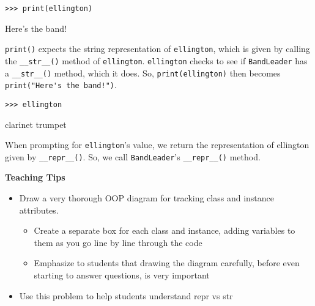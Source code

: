 \begin{blocksection}
\vspace{2\baselineskip}

\begin{lstlisting}
>>> print(ellington)
\end{lstlisting}
\begin{solution}[.2in]
Here's the band!

\lstinline{print()} expects the string representation of \lstinline{ellington}, which is given by calling the \lstinline{__str__()} method of \lstinline{ellington}. \lstinline{ellington} checks to see if \lstinline{BandLeader} has a \lstinline{__str__()} method, which it does. So, \lstinline{print(ellington)} then becomes \lstinline{print("Here's the band!")}.
\end{solution}

\vspace{2\baselineskip}
\end{blocksection}
\begin{blocksection}
\begin{lstlisting}
>>> ellington
\end{lstlisting}
\begin{solution}[.2in]
clarinet trumpet

When prompting for \lstinline{ellington}’s value, we return the representation of ellington given by \lstinline{__repr__()}. So, we call \lstinline{BandLeader}’s \lstinline{__repr__()} method.

\end{solution}
\end{blocksection}

\begin{blocksection}
\begin{guide}
\textbf{Teaching Tips}
\begin{itemize}
\item Draw a very thorough OOP diagram for tracking class and instance attributes.
\begin{itemize}
  \item Create a separate box for each class and instance, adding variables to them as you go line by line through the code
  \item Emphasize to students that drawing the diagram carefully, before even starting to answer questions, is very important
\end{itemize}
\item Use this problem to help students understand repr vs str
\end{itemize}
\end{guide}
\end{blocksection}
